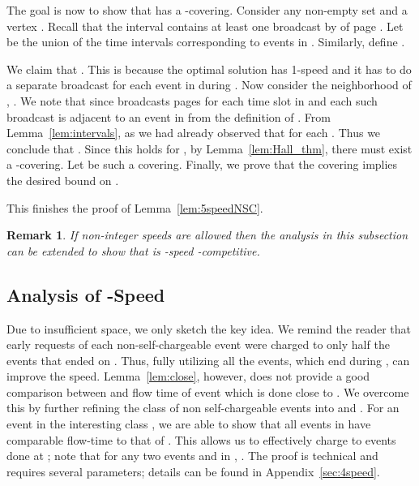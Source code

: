 \documentclass[11pt]{article}
\newtheorem{remark}[lemma]{Remark}
\begin{document}
\begin{titlepage}
The goal is now to show that  has a -covering. Consider any non-empty set  and a vertex . Recall that the interval 
contains at least one broadcast by  of page . Let
 be the union of the
time intervals corresponding to events in . Similarly, define
.

We claim that . This is because the optimal
solution has 1-speed and it has to do a separate broadcast for each
event in  during . Now consider the neighborhood of
, .  We note that  since
 broadcasts  pages for each time slot in 
and each such broadcast is adjacent to an event in  from the
definition of .  From Lemma~\ref{lem:intervals},  as we had already observed
that  for each . Thus we conclude that . Since this holds for , by
Lemma~\ref{lem:Hall_thm}, there must exist a -covering. Let  be such a covering. Finally, we prove
that the covering implies the desired bound on . \vspace{-2.5mm}



This finishes the proof of Lemma~\ref{lem:5speedNSC}.


\begin{remark}
  If non-integer speeds are allowed then the analysis in this
  subsection can be extended to show that  is -speed
  -competitive.
\vspace{-2.5mm}
\end{remark}

\subsection{Analysis of -Speed}\vspace{-2mm}
\label{sec:4speed}
Due to insufficient space, we only sketch the key idea.  We remind the
reader that early requests of each non-self-chargeable event 
were charged to only half the events that ended on .  Thus, fully utilizing all the events, which end during
, can improve the speed.
Lemma~\ref{lem:close}, however, does not provide a good comparison
between  and flow time of event  which is done
close to . We overcome this by further refining the class of
non self-chargeable events into  and . For an event
 in the interesting class , we are able to show that
all events in  have comparable flow-time to
that of . This allows us to effectively charge  to
events done at ; note that for any two events  and
 in , . The proof is technical and
requires several parameters; details can be found in
Appendix~\ref{sec:4speed}.



\end{titlepage}
\end{document}
